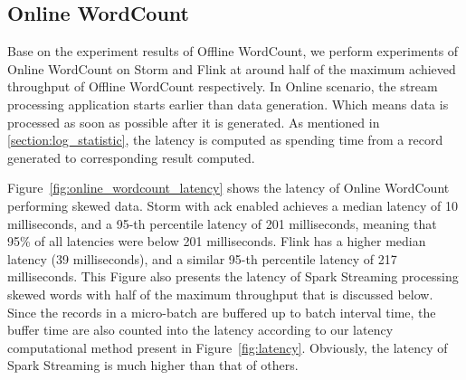 \subsection{Online WordCount}
\label{subsec:online_wordcount}

Base on the experiment results of Offline WordCount, we perform experiments of Online WordCount on Storm and Flink at around half of the maximum achieved throughput of Offline WordCount respectively. In Online scenario, the stream processing application starts earlier than data generation. Which means data is processed as soon as possible after it is generated. As mentioned in \cref{section:log_statistic}, the latency is computed as spending time from a record generated to corresponding result computed.

Figure~\ref{fig:online_wordcount_latency} shows the latency of Online WordCount performing skewed data. Storm with ack enabled achieves a median latency of 10 milliseconds, and a 95-th percentile latency of 201 milliseconds, meaning that 95\% of all latencies were below 201 milliseconds. Flink has a higher median latency (39 milliseconds), and a similar 95-th percentile latency of 217 milliseconds. This Figure also presents the latency of Spark Streaming processing skewed words with half of the maximum throughput that is discussed below. Since the records  in a micro-batch are buffered up to batch interval time, the buffer time are also counted into the latency according to our latency computational method present in Figure~\ref{fig:latency}. Obviously, the latency of Spark Streaming is much higher than that of others.


